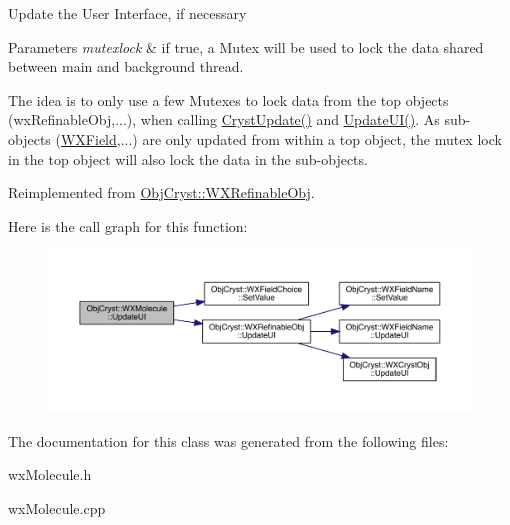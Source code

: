 Update the User Interface, if necessary


\begin{DoxyParams}{Parameters}
{\em mutexlock} & if true, a Mutex will be used to lock the data shared between main and background thread.\\
\hline
\end{DoxyParams}
The idea is to only use a few Mutexes to lock data from the top objects (wx\+Refinable\+Obj,...), when calling \mbox{\hyperlink{class_obj_cryst_1_1_w_x_molecule_a19b65e2f9b5da859675278ff74f3f5e9}{Cryst\+Update()}} and \mbox{\hyperlink{class_obj_cryst_1_1_w_x_molecule_ac234eca0ea8eb99e4d94387c506f1643}{Update\+U\+I()}}. As sub-\/objects (\mbox{\hyperlink{class_obj_cryst_1_1_w_x_field}{W\+X\+Field}},...) are only updated from within a top object, the mutex lock in the top object will also lock the data in the sub-\/objects. 

Reimplemented from \mbox{\hyperlink{class_obj_cryst_1_1_w_x_refinable_obj_acbf70975a79661a73a1ae3c39c9c3045}{Obj\+Cryst\+::\+W\+X\+Refinable\+Obj}}.

Here is the call graph for this function\+:
\nopagebreak
\begin{figure}[H]
\begin{center}
\leavevmode
\includegraphics[width=350pt]{class_obj_cryst_1_1_w_x_molecule_ac234eca0ea8eb99e4d94387c506f1643_cgraph}
\end{center}
\end{figure}


The documentation for this class was generated from the following files\+:\begin{DoxyCompactItemize}
\item 
wx\+Molecule.\+h\item 
wx\+Molecule.\+cpp\end{DoxyCompactItemize}
